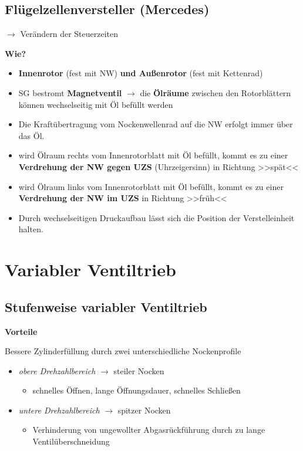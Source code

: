 \subsection{Flügelzellenversteller
(Mercedes)}\label{fluegelzellenversteller-mercedes}

$\to$ Verändern der Steuerzeiten

\textbf{Wie?}

\begin{itemize}
\item
  \textbf{Innenrotor} (fest mit NW) \textbf{und Außenrotor} (fest mit
  Kettenrad)
\item
  SG bestromt \textbf{Magnetventil} $\to$ die \textbf{Ölräume}
  zwischen den Rotorblättern können wechselseitig mit Öl befüllt werden
\item
  Die Kraftübertragung vom Nockenwellenrad auf die NW erfolgt immer über
  das Öl.
\item
  wird Ölraum rechts vom Innenrotorblatt mit Öl befüllt, kommt es zu
  einer \textbf{Verdrehung der NW gegen UZS} (Uhrzeigersinn) in Richtung
  >>spät<<
\item
  wird Ölraum links vom Innenrotorblatt mit Öl befüllt, kommt es zu
  einer \textbf{Verdrehung der NW im UZS} in Richtung >>früh<<
\item
  Durch wechselseitigen Druckaufbau lässt sich die Position der
  Verstelleinheit halten.
\end{itemize}

\section{Variabler Ventiltrieb}\label{variabler-ventiltrieb}

\subsection{Stufenweise variabler
Ventiltrieb}\label{stufenweise-variabler-ventiltrieb}

\textbf{Vorteile}

Bessere Zylinderfüllung durch zwei unterschiedliche Nockenprofile

\begin{itemize}
\item
  \emph{obere Drehzahlbereich} $\to$ steiler Nocken

  \begin{itemize}
  \item
    schnelles Öffnen, lange Öffnungsdauer, schnelles Schließen
  \end{itemize}
\item
  \emph{untere Drehzahlbereich} $\to$ spitzer Nocken

  \begin{itemize}
  \item
    Verhinderung von ungewollter Abgasrückführung durch zu lange
    Ventilüberschneidung
  \end{itemize}
\end{itemize}


